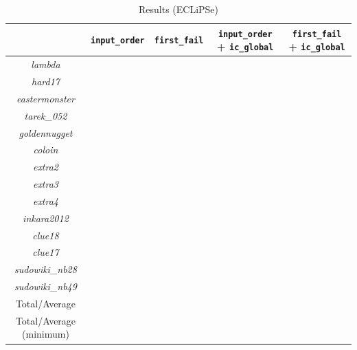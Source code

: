 \begin{table}[]
\bgroup
\def\arraystretch{1.3}
\begin{tabular}{ccccc}
\multicolumn{1}{l}{}    & \texttt{input\_order} & \texttt{first\_fail} & \texttt{input\_order} + \texttt{ic\_global} & \texttt{first\_fail} + \texttt{ic\_global} \\ \hline
\textit{lambda}          &              &             &                           &                          \\
\textit{hard17}          &              &             &                           &                          \\
\textit{eastermonster}   &              &             &                           &                          \\
\textit{tarek\_052}      &              &             &                           &                          \\
\textit{goldennugget}    &              &             &                           &                          \\
\textit{coloin}          &              &             &                           &                          \\
\textit{extra2}          &              &             &                           &                          \\
\textit{extra3}          &              &             &                           &                          \\
\textit{extra4}          &              &             &                           &                          \\
\textit{inkara2012}      &              &             &                           &                          \\
\textit{clue18}          &              &             &                           &                          \\
\textit{clue17}          &              &             &                           &                          \\
\textit{sudowiki\_nb28}  &              &             &                           &                          \\
\textit{sudowiki\_nb49}  &              &             &                           &                          \\\hline
Total/Average           &              &             &                           &                          \\
Total/Average (minimum) &              &             &                           &                         
\end{tabular}
\egroup
\caption{Results (ECLiPSe)}
\label{tab:res1}
\end{table}